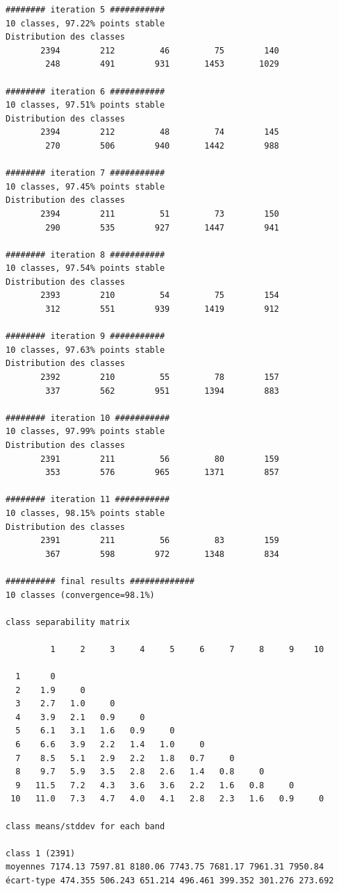 \documentclass[earth,article,submit,pdftex,moreauthors]{Definitions/mdpi}
\begin{document}
\begin{scriptsize}
\begin{verbatim}
######## iteration 5 ###########
10 classes, 97.22% points stable
Distribution des classes
       2394        212         46         75        140
        248        491        931       1453       1029

######## iteration 6 ###########
10 classes, 97.51% points stable
Distribution des classes
       2394        212         48         74        145
        270        506        940       1442        988

######## iteration 7 ###########
10 classes, 97.45% points stable
Distribution des classes
       2394        211         51         73        150
        290        535        927       1447        941

######## iteration 8 ###########
10 classes, 97.54% points stable
Distribution des classes
       2393        210         54         75        154
        312        551        939       1419        912

######## iteration 9 ###########
10 classes, 97.63% points stable
Distribution des classes
       2392        210         55         78        157
        337        562        951       1394        883

######## iteration 10 ###########
10 classes, 97.99% points stable
Distribution des classes
       2391        211         56         80        159
        353        576        965       1371        857

######## iteration 11 ###########
10 classes, 98.15% points stable
Distribution des classes
       2391        211         56         83        159
        367        598        972       1348        834

########## final results #############
10 classes (convergence=98.1%)

class separability matrix

         1     2     3     4     5     6     7     8     9    10

  1      0
  2    1.9     0
  3    2.7   1.0     0
  4    3.9   2.1   0.9     0
  5    6.1   3.1   1.6   0.9     0
  6    6.6   3.9   2.2   1.4   1.0     0
  7    8.5   5.1   2.9   2.2   1.8   0.7     0
  8    9.7   5.9   3.5   2.8   2.6   1.4   0.8     0
  9   11.5   7.2   4.3   3.6   3.6   2.2   1.6   0.8     0
 10   11.0   7.3   4.7   4.0   4.1   2.8   2.3   1.6   0.9     0

class means/stddev for each band

class 1 (2391)
moyennes 7174.13 7597.81 8180.06 7743.75 7681.17 7961.31 7950.84
écart-type 474.355 506.243 651.214 496.461 399.352 301.276 273.692


\end{verbatim}
\end{scriptsize}
\end{document}
